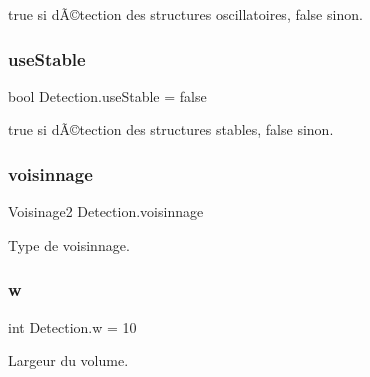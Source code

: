 true si dÃ©tection des structures oscillatoires, false sinon. 

\mbox{\label{class_detection_a78bb8c89cca9479bb2bb4ef0f5e96945}} 
\subsubsection{\texorpdfstring{use\+Stable}{useStable}}
{\footnotesize\ttfamily bool Detection.\+use\+Stable = false\hspace{0.3cm}{\ttfamily [private]}}



true si dÃ©tection des structures stables, false sinon. 

\mbox{\label{class_detection_a6f99794fd28f6f79dedfc541f8b78154}} 
\subsubsection{\texorpdfstring{voisinnage}{voisinnage}}
{\footnotesize\ttfamily Voisinage2 Detection.\+voisinnage\hspace{0.3cm}{\ttfamily [private]}}



Type de voisinnage. 

\mbox{\label{class_detection_a15fdbc0a47657ec7c4bf5228a950079d}} 
\subsubsection{\texorpdfstring{w}{w}}
{\footnotesize\ttfamily int Detection.\+w = 10\hspace{0.3cm}{\ttfamily [private]}}



Largeur du volume. 

